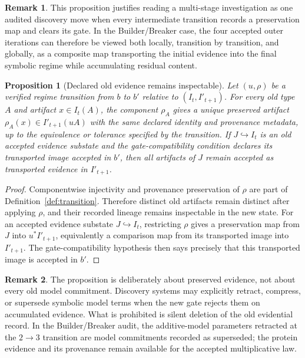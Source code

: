 \documentclass[11pt]{article}
\newtheorem{proposition}[theorem]{Proposition}
\theoremstyle{definition}
\newtheorem{remark}{Remark}
\begin{document}
\begin{remark}
This proposition justifies reading a multi-stage investigation as one audited discovery move when every intermediate transition records a preservation map and clears its gate. In the Builder/Breaker case, the four accepted outer iterations can therefore be viewed both locally, transition by transition, and globally, as a composite map transporting the initial evidence into the final symbolic regime while accumulating residual content.
\end{remark}

\begin{proposition}[Declared old evidence remains inspectable]
\label{prop:evidence_conservativity}
Let $(u,\rho)$ be a verified regime transition from $b$ to $b'$ relative to $(I_t,I'_{t+1})$. For every old type $A$ and artifact $x\in I_t(A)$, the component $\rho_A$ gives a unique preserved artifact $\rho_A(x)\in I'_{t+1}(uA)$ with the same declared identity and provenance metadata, up to the equivalence or tolerance specified by the transition. If $J\hookrightarrow I_t$ is an old accepted evidence substate and the gate-compatibility condition declares its transported image accepted in $b'$, then all artifacts of $J$ remain accepted as transported evidence in $I'_{t+1}$.
\end{proposition}

\begin{proof}
Componentwise injectivity and provenance preservation of $\rho$ are part of Definition~\ref{def:transition}. Therefore distinct old artifacts remain distinct after applying $\rho$, and their recorded lineage remains inspectable in the new state. For an accepted evidence substate $J\hookrightarrow I_t$, restricting $\rho$ gives a preservation map from $J$ into $u^*I'_{t+1}$, equivalently a comparison map from its transported image into $I'_{t+1}$. The gate-compatibility hypothesis then says precisely that this transported image is accepted in $b'$.
\end{proof}

\begin{remark}
The proposition is deliberately about preserved evidence, not about every old model commitment. Discovery systems may explicitly retract, compress, or supersede symbolic model terms when the new gate rejects them on accumulated evidence. What is prohibited is silent deletion of the old evidential record. In the Builder/Breaker audit, the additive-model parameters retracted at the $2\to3$ transition are model commitments recorded as superseded; the protein evidence and its provenance remain available for the accepted multiplicative law.
\end{remark}
\end{document}
